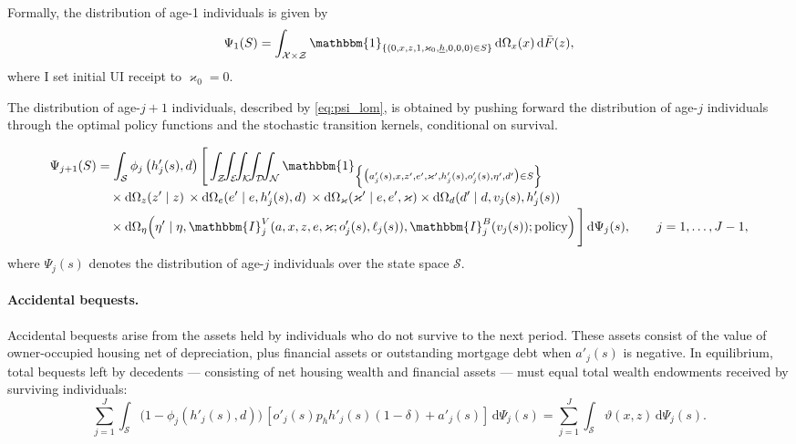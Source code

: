 \documentclass[parskip=full]{article}
\newcommand{\indicator}[1]{\mathbbm{1}_{\left\{ {#1} \right\} }}
\theoremstyle{plain}
\theoremstyle{definition}
\theoremstyle{remark}
\begin{document}
Formally, the distribution of age-1 individuals is given by
\begin{equation}
\label{eq:psi1}
\Psi_1(S)=\int_{\mathcal{X}\times\mathcal{Z}} \indicator{(0,x,z,1,\varkappa_0,\underline{h},0,0,0)\in S}\,\mathrm{d}\Omega_x(x)\,\mathrm{d}\bar F(z),
\end{equation}
where I set initial UI receipt to $\varkappa_0=0$.

The distribution of age-$j+1$ individuals, described by \eqref{eq:psi_lom}, is obtained by pushing forward the distribution of age-$j$ individuals through the optimal policy functions and the stochastic transition kernels, conditional on survival.

\begin{equation}
\label{eq:psi_lom}
\begin{alignedat}{2}
\Psi_{j+1}(S)&=\int_{\mathcal{S}}\phi_j\left(h'_j(s),d\right)
\Bigg[\int_{\mathcal{Z}}\!\!\int_{\mathcal{E}}\!\!\int_{\mathcal{K}}\!\!\int_{\mathcal{D}}\!\!\int_{\mathcal{N}}\indicator{\big(a'_j(s),x,z',e',\varkappa',h'_j(s),o'_j(s),\eta',d'\big)\in S} \\[-0.5ex]
&\quad \times \mathrm{d}\Omega_z(z'\mid z)\,\times\mathrm{d}\Omega_e(e'\mid e,h'_j(s),d)\, \times\mathrm{d}\Omega_{\varkappa}(\varkappa' \mid e,e',\varkappa)
 \times\mathrm{d}\Omega_d(d'\mid d,v_j(s),h'_j(s))\\[-0.5ex]
&\quad \times \mathrm{d}\Omega_\eta\!\left(\eta' \mid \eta,\mathbbm{I}_j^{V}(a,x,z,e,\varkappa;o'_j(s),\ell_j(s)),\mathbbm{I}_j^{B}(v_j(s));\text{policy}\right) \Bigg]\,\mathrm{d}\Psi_j(s),\qquad j=1,\ldots,J-1,
\end{alignedat}
\end{equation}
where $\Psi_j(s)$ denotes the distribution of age-$j$ individuals over the state space $\mathcal{S}$.

\paragraph{Accidental bequests.}

Accidental bequests arise from the assets held by individuals who do not survive to the next period. These assets consist of the value of owner-occupied housing net of depreciation, plus financial assets or outstanding mortgage debt when $a'_j(s)$ is negative. In equilibrium, total bequests left by decedents — consisting of net housing wealth and financial assets — must equal total wealth endowments received by surviving individuals:
\begin{equation}
\label{eq:bequests}
\sum_{j=1}^J \int_{\mathcal{S}}\big(1-\phi_j(h'_j(s),d)\big)\,\left[o'_j(s)p_h h'_j(s)(1-\delta)+a'_j(s)\right]\,
\mathrm{d}\Psi_j(s)=\sum_{j=1}^J \int_{\mathcal{S}} \vartheta(x,z)\,\mathrm{d}\Psi_j(s).
\end{equation}
\end{document}
